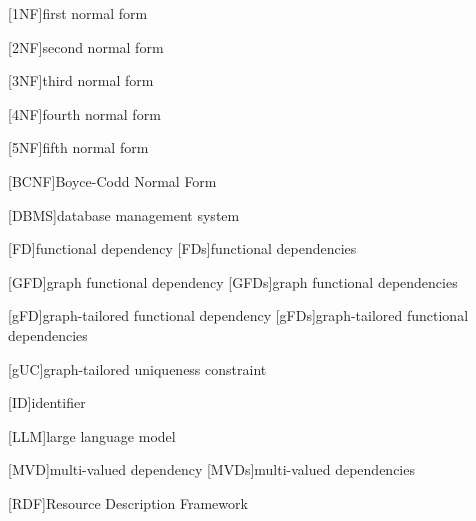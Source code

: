 \begin{acronym}

[1NF]{first normal form}

[2NF]{second normal form}

[3NF]{third normal form}

[4NF]{fourth normal form}

[5NF]{fifth normal form}

[BCNF]{Boyce-Codd Normal Form}

[DBMS]{database management system}

[FD]{functional dependency}
[FDs]{functional dependencies}

[GFD]{graph functional dependency}
[GFDs]{graph functional dependencies}

[gFD]{graph-tailored functional dependency}
[gFDs]{graph-tailored functional dependencies}

[gUC]{graph-tailored uniqueness constraint}

[ID]{identifier}

[LLM]{large language model}

[MVD]{multi-valued dependency}
[MVDs]{multi-valued dependencies}

[RDF]{Resource Description Framework}

\end{acronym}

